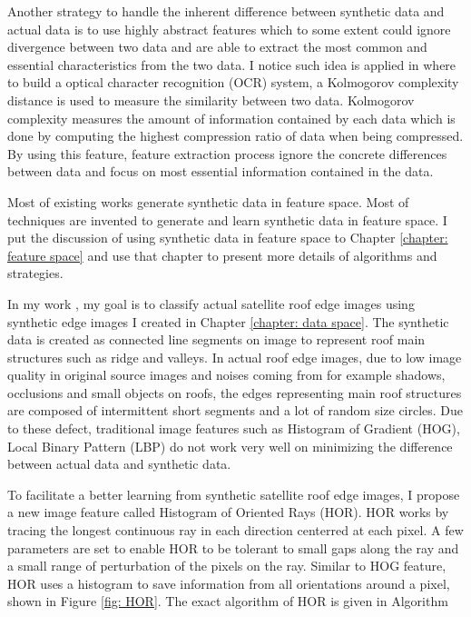 \documentclass{iitthesis}
\begin{document}
Another strategy to handle the inherent difference between synthetic data and actual data is to use highly abstract features which to some extent could ignore divergence between two data and are able to extract the most common and essential characteristics from the two data. I notice such idea is applied in \cite{Ulanova2014} where to build a optical character recognition (OCR) system, a Kolmogorov complexity distance is used to measure the similarity between two data. Kolmogorov complexity measures the amount of information contained by each data which is done by computing the highest compression ratio of data when being compressed. By using this feature, feature extraction process ignore the concrete differences between data and focus on most essential information contained in the data.
  

Most of existing works generate synthetic data in feature space. Most of techniques are invented to generate and learn synthetic data in feature space. I put the discussion of using synthetic data in feature space to Chapter \ref{chapter: feature space} and use that chapter to present more details of algorithms and strategies.  


 In my work \cite{AndiZang2015}, my goal is to classify actual satellite roof edge images using synthetic edge images I created in Chapter \ref{chapter: data space}. The synthetic data is created as connected line segments on image to represent roof main structures such as ridge and valleys. In actual roof edge images, due to low image quality in original source images and noises coming from for example shadows, occlusions and small objects on roofs, the edges representing main roof structures are composed of intermittent short segments and a lot of random size circles. Due to these defect, traditional image features such as Histogram of Gradient (HOG), Local Binary Pattern (LBP) do not work very well on minimizing the difference between actual data and synthetic data.

To facilitate a better learning from synthetic satellite roof edge images, I propose a new image feature called Histogram of Oriented Rays (HOR). HOR works by tracing the longest continuous ray in each direction centerred at each pixel. A few parameters are set to enable HOR to be tolerant to small gaps along the ray and a small range of perturbation of the pixels on the ray. Similar to HOG feature, HOR uses a histogram to save information from all orientations around a pixel, shown in Figure \ref{fig: HOR}. The exact algorithm of HOR is given in Algorithm 
\end{document}
